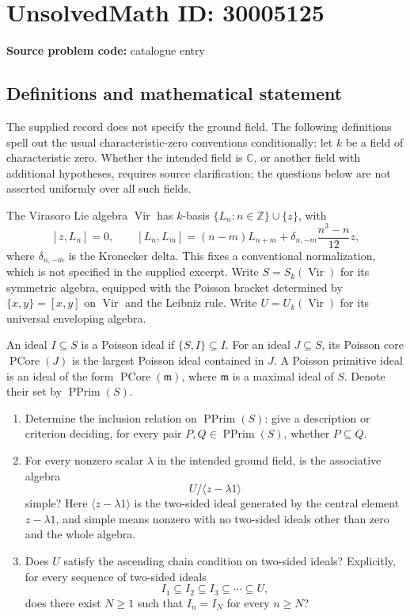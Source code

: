 \documentclass[11pt]{article}
\newcommand{\Z}{\mathbb{Z}}
\newcommand{\C}{\mathbb{C}}
\begin{document}
\section*{UnsolvedMath ID: 30005125}
\textbf{Source problem code:} catalogue entry
\subsection{Definitions and mathematical statement}
The supplied record does not specify the ground field. The following definitions spell out the usual characteristic-zero conventions conditionally: let \(k\) be a field of characteristic zero. Whether the intended field is \(\C\), or another field with additional hypotheses, requires source clarification; the questions below are not asserted uniformly over all such fields.

The Virasoro Lie algebra \(\operatorname{Vir}\) has \(k\)-basis \(\{L_n:n\in\Z\}\cup\{z\}\), with
\[
[z,L_n]=0,\qquad [L_n,L_m]=(n-m)L_{n+m}+\delta_{n,-m}\frac{n^3-n}{12}z,
\]
where \(\delta_{n,-m}\) is the Kronecker delta. This fixes a conventional normalization, which is not specified in the supplied excerpt. Write \(S=S_k(\operatorname{Vir})\) for its symmetric algebra, equipped with the Poisson bracket determined by \(\{x,y\}=[x,y]\) on \(\operatorname{Vir}\) and the Leibniz rule. Write \(U=U_k(\operatorname{Vir})\) for its universal enveloping algebra.

An ideal \(I\subseteq S\) is a Poisson ideal if \(\{S,I\}\subseteq I\). For an ideal \(J\subseteq S\), its Poisson core \(\operatorname{PCore}(J)\) is the largest Poisson ideal contained in \(J\). A Poisson primitive ideal is an ideal of the form \(\operatorname{PCore}(\mathfrak m)\), where \(\mathfrak m\) is a maximal ideal of \(S\). Denote their set by \(\operatorname{PPrim}(S)\).

\begin{enumerate}
\item[(A)] Determine the inclusion relation on \(\operatorname{PPrim}(S)\): give a description or criterion deciding, for every pair \(P,Q\in\operatorname{PPrim}(S)\), whether \(P\subseteq Q\).
\item[(B)] For every nonzero scalar \(\lambda\) in the intended ground field, is the associative algebra
\[
U\big/\langle z-\lambda 1\rangle
\]
simple? Here \(\langle z-\lambda 1\rangle\) is the two-sided ideal generated by the central element \(z-\lambda 1\), and simple means nonzero with no two-sided ideals other than zero and the whole algebra.
\item[(C)] Does \(U\) satisfy the ascending chain condition on two-sided ideals? Explicitly, for every sequence of two-sided ideals
\[
I_1\subseteq I_2\subseteq I_3\subseteq\cdots\subseteq U,
\]
does there exist \(N\geq1\) such that \(I_n=I_N\) for every \(n\geq N\)?
\end{enumerate}
\end{document}
